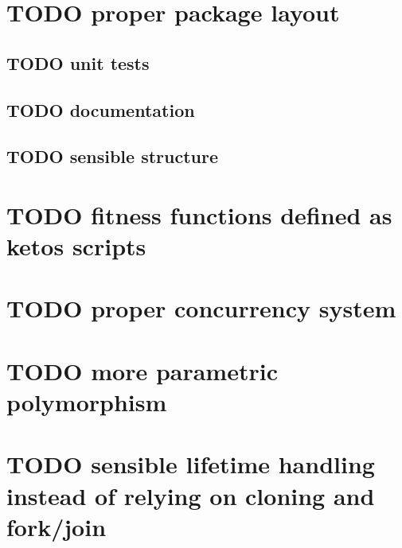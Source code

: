 \documentclass[11pt]{article}
\date{\today}
\title{}
\begin{document}
\tableofcontents

\section{{\bfseries\sffamily TODO} proper package layout}
\label{sec:orgfa84a12}
\subsection{{\bfseries\sffamily TODO} unit tests}
\label{sec:orgba1e8bf}
\subsection{{\bfseries\sffamily TODO} documentation}
\label{sec:org5e3bfdd}
\subsection{{\bfseries\sffamily TODO} sensible structure}
\label{sec:org82cd79e}
\section{{\bfseries\sffamily TODO} fitness functions defined as ketos scripts}
\label{sec:orgd802e19}
\section{{\bfseries\sffamily TODO} proper concurrency system}
\label{sec:org2f65cfb}
\section{{\bfseries\sffamily TODO} more parametric polymorphism}
\label{sec:orge0682a1}
\section{{\bfseries\sffamily TODO} sensible lifetime handling instead of relying on cloning and fork/join}
\label{sec:org15d3be7}
\end{document}
